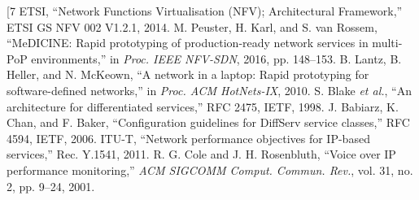 \documentclass[a4paper]{llncs}
\begin{document}
\begin{thebibliography}{[7}
\makeatletter\renewcommand\@biblabel[1]{[#1]}\makeatother  %
 ETSI, ``Network Functions Virtualisation (NFV); Architectural Framework,'' ETSI GS NFV 002 V1.2.1, 2014.
 M. Peuster, H. Karl, and S. van Rossem, ``MeDICINE: Rapid prototyping of production-ready network services in multi-PoP environments,'' in \emph{Proc. IEEE NFV-SDN}, 2016, pp. 148--153.
 B. Lantz, B. Heller, and N. McKeown, ``A network in a laptop: Rapid prototyping for software-defined networks,'' in \emph{Proc. ACM HotNets-IX}, 2010.
 S. Blake \emph{et al.}, ``An architecture for differentiated services,'' RFC 2475, IETF, 1998.
 J. Babiarz, K. Chan, and F. Baker, ``Configuration guidelines for DiffServ service classes,'' RFC 4594, IETF, 2006.
 ITU-T, ``Network performance objectives for IP-based services,'' Rec. Y.1541, 2011.
 R. G. Cole and J. H. Rosenbluth, ``Voice over IP performance monitoring,'' \emph{ACM SIGCOMM Comput. Commun. Rev.}, vol. 31, no. 2, pp. 9--24, 2001.
\end{thebibliography}
\end{document}
